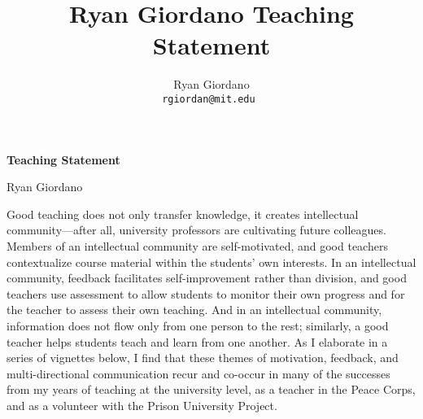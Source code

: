

\usepackage{enumitem}

\usepackage{geometry}
\geometry{top=0.9in}
\geometry{left=1.4in}
\geometry{right=1.4in}


\title{Ryan Giordano Teaching Statement}

\author{
  Ryan Giordano \\ \texttt{rgiordan@mit.edu }
}




\begin{minipage}[t]{0.5\textwidth}
\hspace{-2em} %
{\bf \LARGE Teaching Statement}\\
\end{minipage}
\begin{minipage}[t]{0.5\textwidth}
        \hspace{8em} %
        {\LARGE Ryan Giordano}
\end{minipage}

Good teaching does not only transfer knowledge, it creates intellectual
community---after all, university professors are cultivating future colleagues.
Members of an intellectual community are self-motivated, and good teachers
contextualize course material within the students' own interests. In an
intellectual community, feedback facilitates self-improvement rather than
division, and good teachers use assessment to allow students to monitor their
own progress and for the teacher to assess their own teaching.  And in an
intellectual community, information does not flow only from one person to the
rest; similarly, a good teacher helps students teach and learn from one another.
As I elaborate in a series of vignettes below, I find that these themes of
motivation, feedback, and multi-directional communication recur and co-occur in
many of the successes from my years of teaching at the university level, as a
teacher in the Peace Corps, and as a volunteer with the Prison University
Project.

